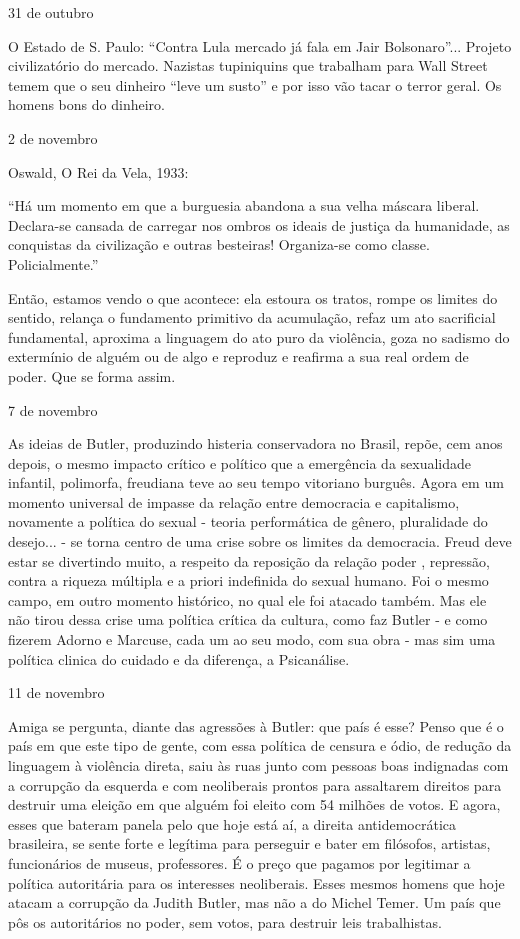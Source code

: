 31 de outubro

O Estado de S. Paulo: ``Contra Lula mercado já fala em Jair
Bolsonaro''... Projeto civilizatório do mercado. Nazistas tupiniquins
que trabalham para Wall Street temem que o seu dinheiro ``leve um
susto'' e por isso vão tacar o terror geral. Os homens bons do dinheiro.

2 de novembro

Oswald, O Rei da Vela, 1933:

``Há um momento em que a burguesia abandona a sua velha máscara liberal.
Declara-se cansada de carregar nos ombros os ideais de justiça da
humanidade, as conquistas da civilização e outras besteiras! Organiza-se
como classe. Policialmente.''

Então, estamos vendo o que acontece: ela estoura os tratos, rompe os
limites do sentido, relança o fundamento primitivo da acumulação, refaz
um ato sacrificial fundamental, aproxima a linguagem do ato puro da
violência, goza no sadismo do extermínio de alguém ou de algo e reproduz
e reafirma a sua real ordem de poder. Que se forma assim.

7 de novembro

As ideias de Butler, produzindo histeria conservadora no Brasil, repõe,
cem anos depois, o mesmo impacto crítico e político que a emergência da
sexualidade infantil, polimorfa, freudiana teve ao seu tempo vitoriano
burguês. Agora em um momento universal de impasse da relação entre
democracia e capitalismo, novamente a política do sexual - teoria
performática de gênero, pluralidade do desejo... - se torna centro de
uma crise sobre os limites da democracia. Freud deve estar se divertindo
muito, a respeito da reposição da relação poder , repressão, contra a
riqueza múltipla e a priori indefinida do sexual humano. Foi o mesmo
campo, em outro momento histórico, no qual ele foi atacado também. Mas
ele não tirou dessa crise uma política crítica da cultura, como faz
Butler - e como fizerem Adorno e Marcuse, cada um ao seu modo, com sua
obra - mas sim uma política clinica do cuidado e da diferença, a
Psicanálise.

11 de novembro

Amiga se pergunta, diante das agressões à Butler: que país é esse? Penso
que é o país em que este tipo de gente, com essa política de censura e
ódio, de redução da linguagem à violência direta, saiu às ruas junto com
pessoas boas indignadas com a corrupção da esquerda e com neoliberais
prontos para assaltarem direitos para destruir uma eleição em que alguém
foi eleito com 54 milhões de votos. E agora, esses que bateram panela
pelo que hoje está aí, a direita antidemocrática brasileira, se sente
forte e legítima para perseguir e bater em filósofos, artistas,
funcionários de museus, professores. É o preço que pagamos por legitimar
a política autoritária para os interesses neoliberais. Esses mesmos
homens que hoje atacam a corrupção da Judith Butler, mas não a do Michel
Temer. Um país que pôs os autoritários no poder, sem votos, para
destruir leis trabalhistas.

